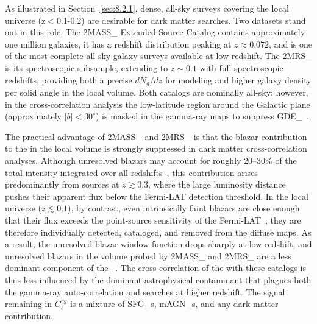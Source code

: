 As illustrated in Section~\ref{sec:8.2.1},  dense, all-sky surveys covering the local universe (z$<$0.1-0.2) are desirable for dark matter searches.
Two datasets stand out in this role.
The \gls{2MASS_} Extended Source Catalog contains approximately one million galaxies, it has a redshift distribution peaking at $z \approx 0.072$, and is one of the most complete all-sky galaxy surveys available at low redshift. The \gls{2MRS_} is its spectroscopic subsample, extending to $z \sim 0.1$ with full spectroscopic redshifts, providing both a precise $dN_g/dz$ for modeling and higher galaxy density per solid angle in the local volume.
Both catalogs are nominally all-sky; however, in the cross-correlation analysis the low-latitude region around the Galactic plane (approximately $|b| < 30^\circ$) is masked in the gamma-ray maps to suppress \gls{GDE_}~\cite{xia2015tomography,DGRB-review}.

The practical advantage of \gls{2MASS_} and \gls{2MRS_} is that the blazar contribution to the \UGRB in the local volume is strongly suppressed in dark matter cross-correlation analyses.
Although unresolved blazars may account for roughly 20--30\% of the total \UGRB intensity integrated over all redshifts~\cite{Ajello:2015mfa}, this contribution arises predominantly from sources at $z \gtrsim 0.3$, where the large luminosity distance pushes their apparent flux below the Fermi-LAT detection threshold.
In the local universe ($z \lesssim 0.1$), by contrast, even intrinsically faint blazars are close enough that their flux exceeds the point-source sensitivity of the Fermi-LAT~\cite{DGRB-review}; they are therefore individually detected, cataloged, and removed from the diffuse maps.
As a result, the unresolved blazar window function drops sharply at low redshift, and unresolved blazars in the volume probed by \gls{2MASS_} and \gls{2MRS_} are a less dominant component of the \UGRB~\cite{DGRB-review,Cuoco:2015rfa}.
The cross-correlation of the \UGRB with these catalogs is thus less influenced by the dominant astrophysical contaminant that plagues both the gamma-ray auto-correlation and searches at higher redshift.
The signal remaining in $C_\ell^{\gamma g}$ is a mixture of \glspl{SFG_}, \glspl{mAGN_}, and any dark matter contribution.

